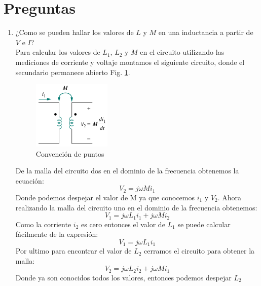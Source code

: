 \documentclass[twocolumn]{IEEEtran}
\begin{document}
\section{Preguntas}
\begin{enumerate}
 \item ¿Como se pueden hallar los valores de $L$ y $M$ en una inductancia a partir de $V$ e $I$?\\
Para calcular los valores de $L_1$, $L_2$ y $M$ en el circuito utilizando las mediciones de corriente y voltaje montamos el siguiente circuito, donde el secundario permanece abierto Fig. \ref{fig99}.
\begin{figure}[H]
	\centering
		\includegraphics[scale=0.8]{pointsa.png}
	\caption{Convención de puntos}
	\label{fig99}
\end{figure}
\noindent
De la malla del circuito dos en el dominio de la frecuencia obtenemos la ecuación:
\begin{equation}
 V_2 = j \omega Mi_1
\label{equ1}
\end{equation}
\noindent
Donde podemos despejar el valor de M ya que conocemos $i_1$ y $V_2$.
Ahora realizando la malla del circuito uno en el dominio de la frecuencia obtenemos:
\begin{equation}
 {V_1} = j\omega {L_1}{i_1} + j\omega M{i_2}
\label{equ2}
\end{equation}
\noindent
Como la corriente $i_2$ es cero entonces el valor de $L_1$ se puede calcular fácilmente de la expresión:
\begin{equation}
 {V_1} = j\omega {L_1}{i_1}
\label{equ3}
\end{equation}
\noindent
Por ultimo para encontrar el valor de $L_2$ cerramos el circuito para obtener la malla:
\begin{equation}
 {V_2} = j\omega {L_2}{i_2} + j\omega M{i_1}
\label{equ4}
\end{equation}
\noindent
Donde ya son conocidos todos los valores, entonces podemos despejar $L_2$


\end{enumerate}
\end{document}
